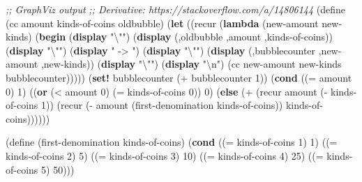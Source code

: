 \documentclass[
]{article}
\newenvironment{Shaded}{}{}
\newcommand{\CharTok}[1]{\textcolor[rgb]{0.25,0.44,0.63}{#1}}
\newcommand{\CommentTok}[1]{\textcolor[rgb]{0.38,0.63,0.69}{\textit{#1}}}
\newcommand{\DecValTok}[1]{\textcolor[rgb]{0.25,0.63,0.44}{#1}}
\newcommand{\ExtensionTok}[1]{#1}
\newcommand{\FunctionTok}[1]{\textcolor[rgb]{0.02,0.16,0.49}{#1}}
\newcommand{\KeywordTok}[1]{\textcolor[rgb]{0.00,0.44,0.13}{\textbf{#1}}}
\newcommand{\NormalTok}[1]{#1}
\newcommand{\OperatorTok}[1]{\textcolor[rgb]{0.40,0.40,0.40}{#1}}
\newcommand{\StringTok}[1]{\textcolor[rgb]{0.25,0.44,0.63}{#1}}
\begin{document}
\begin{Shaded}
\begin{Highlighting}[numbers=left,,]
\CommentTok{;; GraphViz output}
\CommentTok{;; Derivative: https://stackoverflow.com/a/14806144}
\NormalTok{(}\ExtensionTok{define}\FunctionTok{ }\NormalTok{(cc amount kinds{-}of{-}coins oldbubble)}
\NormalTok{  (}\KeywordTok{let}\NormalTok{ ((recur (}\KeywordTok{lambda}\NormalTok{ (new{-}amount new{-}kinds)}
\NormalTok{                 (}\KeywordTok{begin}
\NormalTok{                   (}\KeywordTok{display} \StringTok{"}\CharTok{\textbackslash{}"}\StringTok{"}\NormalTok{)}
\NormalTok{                   (}\KeywordTok{display}\NormalTok{ \textasciigrave{}(,oldbubble ,amount ,kinds{-}of{-}coins))}
\NormalTok{                   (}\KeywordTok{display} \StringTok{"}\CharTok{\textbackslash{}"}\StringTok{"}\NormalTok{)}
\NormalTok{                   (}\KeywordTok{display} \StringTok{" {-}\textgreater{} "}\NormalTok{)}
\NormalTok{                   (}\KeywordTok{display} \StringTok{"}\CharTok{\textbackslash{}"}\StringTok{"}\NormalTok{)}
\NormalTok{                   (}\KeywordTok{display}\NormalTok{ \textasciigrave{}(,bubblecounter ,new{-}amount ,new{-}kinds))}
\NormalTok{                   (}\KeywordTok{display} \StringTok{"}\CharTok{\textbackslash{}"}\StringTok{"}\NormalTok{)}
\NormalTok{                   (}\KeywordTok{display} \StringTok{"}\CharTok{\textbackslash{}n}\StringTok{"}\NormalTok{)}
\NormalTok{                   (cc new{-}amount new{-}kinds bubblecounter)))))}
\NormalTok{    (}\KeywordTok{set!}\NormalTok{ bubblecounter (}\OperatorTok{+}\NormalTok{ bubblecounter }\DecValTok{1}\NormalTok{))}
\NormalTok{    (}\KeywordTok{cond}\NormalTok{ ((}\OperatorTok{=}\NormalTok{ amount }\DecValTok{0}\NormalTok{) }\DecValTok{1}\NormalTok{)}
\NormalTok{          ((}\KeywordTok{or}\NormalTok{ (}\OperatorTok{\textless{}}\NormalTok{ amount }\DecValTok{0}\NormalTok{) (}\OperatorTok{=}\NormalTok{ kinds{-}of{-}coins }\DecValTok{0}\NormalTok{)) }\DecValTok{0}\NormalTok{)}
\NormalTok{          (}\KeywordTok{else}\NormalTok{ (}\OperatorTok{+}
\NormalTok{                 (recur amount (}\OperatorTok{{-}}\NormalTok{ kinds{-}of{-}coins }\DecValTok{1}\NormalTok{))}
\NormalTok{                 (recur (}\OperatorTok{{-}}\NormalTok{ amount}
\NormalTok{                           (first{-}denomination kinds{-}of{-}coins))}
\NormalTok{                        kinds{-}of{-}coins))))))}

\NormalTok{(}\ExtensionTok{define}\FunctionTok{ }\NormalTok{(first{-}denomination kinds{-}of{-}coins)}
\NormalTok{  (}\KeywordTok{cond}\NormalTok{ ((}\OperatorTok{=}\NormalTok{ kinds{-}of{-}coins }\DecValTok{1}\NormalTok{) }\DecValTok{1}\NormalTok{)}
\NormalTok{        ((}\OperatorTok{=}\NormalTok{ kinds{-}of{-}coins }\DecValTok{2}\NormalTok{) }\DecValTok{5}\NormalTok{)}
\NormalTok{        ((}\OperatorTok{=}\NormalTok{ kinds{-}of{-}coins }\DecValTok{3}\NormalTok{) }\DecValTok{10}\NormalTok{)}
\NormalTok{        ((}\OperatorTok{=}\NormalTok{ kinds{-}of{-}coins }\DecValTok{4}\NormalTok{) }\DecValTok{25}\NormalTok{)}
\NormalTok{        ((}\OperatorTok{=}\NormalTok{ kinds{-}of{-}coins }\DecValTok{5}\NormalTok{) }\DecValTok{50}\NormalTok{)))}
\end{Highlighting}
\end{Shaded}
\end{document}
